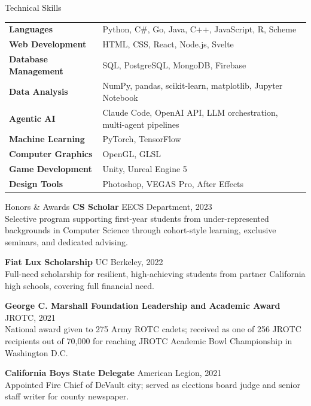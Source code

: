 \documentclass{resume}
\begin{document}

\begin{rSection}{Technical Skills}
\begin{tabular}{ @{} >{\bfseries}l @{\hspace{6ex}} l }
Languages & Python, C\#, Go, Java, C++, JavaScript, R, Scheme \\
Web Development & HTML, CSS, React, Node.js, Svelte \\
Database Management & SQL, PostgreSQL, MongoDB, Firebase \\
Data Analysis & NumPy, pandas, scikit-learn, matplotlib, Jupyter Notebook \\
Agentic AI & Claude Code, OpenAI API, LLM orchestration, multi-agent pipelines \\
Machine Learning & PyTorch, TensorFlow \\
Computer Graphics & OpenGL, GLSL \\
Game Development & Unity, Unreal Engine 5 \\
Design Tools & Photoshop, VEGAS Pro, After Effects \\
\end{tabular}
\end{rSection}


\begin{rSection}{Honors \& Awards}
\textbf{CS Scholar} \hfill EECS Department, 2023\\
Selective program supporting first-year students from under-represented backgrounds in Computer Science through cohort-style learning, exclusive seminars, and dedicated advising.

\textbf{Fiat Lux Scholarship} \hfill UC Berkeley, 2022\\
Full-need scholarship for resilient, high-achieving students from partner California high schools, covering full financial need.

\textbf{George C. Marshall Foundation Leadership and Academic Award} \hfill JROTC, 2021\\
National award given to 275 Army ROTC cadets; received as one of 256 JROTC recipients out of 70,000 for reaching JROTC Academic Bowl Championship in Washington D.C.

\textbf{California Boys State Delegate} \hfill American Legion, 2021\\
Appointed Fire Chief of DeVault city; served as elections board judge and senior staff writer for county newspaper.
\end{rSection}
\end{document}
